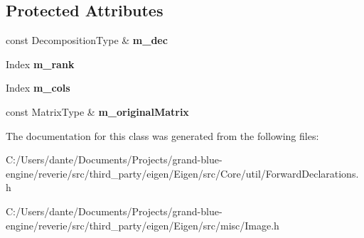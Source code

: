 \subsection*{Protected Attributes}
\begin{DoxyCompactItemize}
\item 
\mbox{\label{struct_eigen_1_1internal_1_1image__retval__base_a4e48509fe5e164f2091e1b77b6a89310}} 
const Decomposition\+Type \& {\bfseries m\+\_\+dec}
\item 
\mbox{\label{struct_eigen_1_1internal_1_1image__retval__base_a87abdc0d556f40c98626bfd5cdc8fc16}} 
Index {\bfseries m\+\_\+rank}
\item 
\mbox{\label{struct_eigen_1_1internal_1_1image__retval__base_aeb29203a8686edacf3f9622cd3973e0b}} 
Index {\bfseries m\+\_\+cols}
\item 
\mbox{\label{struct_eigen_1_1internal_1_1image__retval__base_a46fbe82ef8d86a8ed1915dfe8e8d0708}} 
const Matrix\+Type \& {\bfseries m\+\_\+original\+Matrix}
\end{DoxyCompactItemize}


The documentation for this class was generated from the following files\+:\begin{DoxyCompactItemize}
\item 
C\+:/\+Users/dante/\+Documents/\+Projects/grand-\/blue-\/engine/reverie/src/third\+\_\+party/eigen/\+Eigen/src/\+Core/util/Forward\+Declarations.\+h\item 
C\+:/\+Users/dante/\+Documents/\+Projects/grand-\/blue-\/engine/reverie/src/third\+\_\+party/eigen/\+Eigen/src/misc/Image.\+h\end{DoxyCompactItemize}
